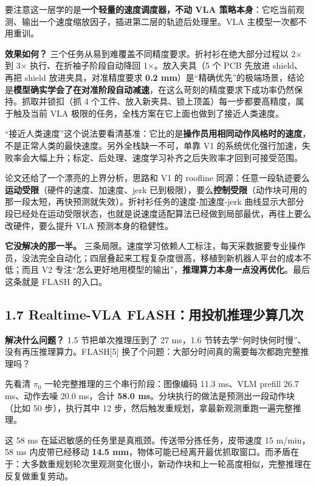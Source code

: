 \documentclass[
  chinese,
]{ctexart}
\begin{document}
要注意这一层学的是\textbf{一个轻量的速度调度器，不动 VLA
策略本身}：它吃当前观测、输出一个速度缩放因子，插进第二层的轨迹后处理里。VLA
主模型一次都不用重训。

\textbf{效果如何？}
三个任务从易到难覆盖不同精度要求。折衬衫在绝大部分过程以 2× 到 3×
执行、在折袖子阶段自动降回 1×。放入夹具（5 个 PCB 先放进 shield、再把
shield 放进夹具，对准精度要求 \textbf{0.2
mm}）是``精确优先''的极端场景，结论是\textbf{模型确实学会了在对准阶段自动减速}，在这么苛刻的精度要求下成功率仍然保持。抓取并锁扣（抓
4 个工件、放入新夹具、锁上顶盖）每一步都要高精度，属于触及当前 VLA
极限的任务，全栈方案在它上面也做到了接近人类速度。

``接近人类速度''这个说法要看清基准：它比的是\textbf{操作员用相同动作风格时的速度}，不是正常人类的最快速度。另外全栈缺一不可，单靠
V1
的系统优化强行加速，失败率会大幅上升；标定、后处理、速度学习补齐之后失败率才回到可接受范围。

论文还给了一个漂亮的上界分析，思路和 V1 的 roofline
同源：任意一段轨迹要么\textbf{运动受限}（硬件的速度、加速度、jerk
已到极限），要么\textbf{控制受限}（动作块可用的那一段太短，再快预测就失效）。折衬衫任务的速度-加速度-jerk
曲线显示大部分段已经处在运动受限状态，也就是说速度适配算法已经做到局部最优，再往上要么改硬件，要么提升
VLA 预测本身的稳健性。

\textbf{它没解决的那一半。}
三条局限。速度学习依赖人工标注，每天采数据要专业操作员，没法完全自动化；四层叠起来工程复杂度很高，移植到新机器人平台的成本不低；而且
V2
专注``怎么更好地用模型的输出''，\textbf{推理算力本身一点没再优化}。最后这条就是
FLASH 的入口。

\subsection{1.7 Realtime-VLA
FLASH：用投机推理少算几次}\label{realtime-vla-flashux7528ux6295ux673aux63a8ux7406ux5c11ux7b97ux51e0ux6b21}

\textbf{解决什么问题？} 1.5 节把单次推理压到了 27 ms，1.6
节转去学``何时快何时慢''、没有再压推理算力。FLASH{[}5{]}
换了个问题：大部分时间真的需要每次都跑完整推理吗？

先看清 \(\pi_0\) 一轮完整推理的三个串行阶段：图像编码 11.3 ms、VLM
prefill 26.7 ms、动作去噪 20.0 ms，合计 \textbf{58.0
ms}。分块执行的做法是预测出一段动作块（比如 50 步），执行其中 12
步，然后触发重规划，拿最新观测重跑一遍完整推理。

这 58 ms 在延迟敏感的任务里是真瓶颈。传送带分拣任务，皮带速度 15
m/min，58 ms 内皮带已经移动 \textbf{14.5
mm}，物体可能已经离开最优抓取窗口。而矛盾在于：大多数重规划轮次里观测变化很小，新动作块和上一轮高度相似，完整推理在反复做重复劳动。
\end{document}

